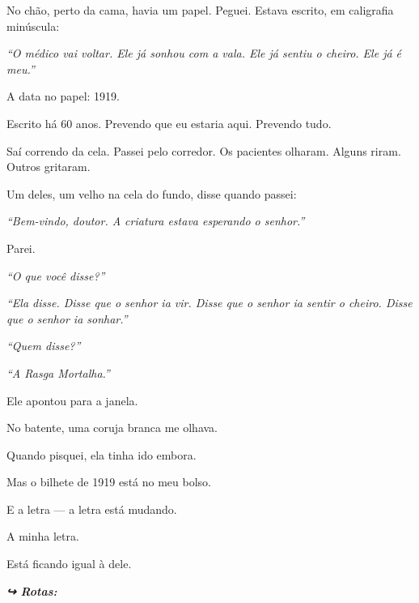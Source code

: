 \noindent No chão, perto da cama, havia um papel. Peguei. Estava escrito, em caligrafia minúscula:

\noindent \textit{\textquotedblleft{}O médico vai voltar. Ele já sonhou com a vala. Ele já sentiu o cheiro. Ele já é meu.\textquotedblright{}}

\noindent A data no papel: 1919.

\noindent Escrito há 60 anos.
Prevendo que eu estaria aqui.
Prevendo tudo.

\noindent Saí correndo da cela. Passei pelo corredor. Os pacientes olharam. Alguns riram. Outros gritaram.

\noindent Um deles, um velho na cela do fundo, disse quando passei:

\noindent \textit{\textquotedblleft{}Bem-vindo, doutor. A criatura estava esperando o senhor.\textquotedblright{}}

\noindent Parei.

\noindent \textit{\textquotedblleft{}O que você disse?\textquotedblright{}}

\noindent \textit{\textquotedblleft{}Ela disse. Disse que o senhor ia vir. Disse que o senhor ia sentir o cheiro. Disse que o senhor ia sonhar.\textquotedblright{}}

\noindent \textit{\textquotedblleft{}Quem disse?\textquotedblright{}}

\noindent \textit{\textquotedblleft{}A Rasga Mortalha.\textquotedblright{}}

\noindent Ele apontou para a janela.

\noindent No batente, uma coruja branca me olhava.

\noindent Quando pisquei, ela tinha ido embora.

\noindent Mas o bilhete de 1919 está no meu bolso.

\noindent E a letra --- a letra está mudando.

\noindent A minha letra.

\noindent Está ficando igual à dele.

\vspace{0.5em}
\noindent\textit{\textbf{↪ Rotas:}  \rotasep {} \rotasep {}}